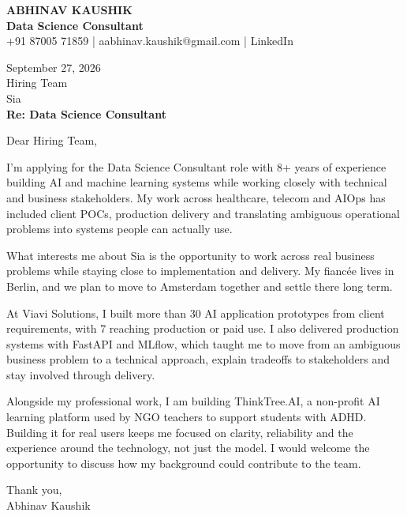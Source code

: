 \documentclass[10pt,a4paper]{article}
\begin{document}
\begin{center}
{\Large\bfseries ABHINAV KAUSHIK}\\[2pt]
{\bfseries Data Science Consultant}\\[2pt]
+91 87005 71859 \quad | \quad aabhinav.kaushik@gmail.com \quad | \quad LinkedIn
\end{center}
\vspace{8pt}
September 27, 2026\\[6pt]
Hiring Team\\
Sia\\[4pt]
\textbf{Re: Data Science Consultant}

Dear Hiring Team,

I’m applying for the Data Science Consultant role with 8+ years of experience building AI and machine learning systems while working closely with technical and business stakeholders. My work across healthcare, telecom and AIOps has included client POCs, production delivery and translating ambiguous operational problems into systems people can actually use.

What interests me about Sia is the opportunity to work across real business problems while staying close to implementation and delivery. My fiancée lives in Berlin, and we plan to move to Amsterdam together and settle there long term.

At Viavi Solutions, I built more than 30 AI application prototypes from client requirements, with 7 reaching production or paid use. I also delivered production systems with FastAPI and MLflow, which taught me to move from an ambiguous business problem to a technical approach, explain tradeoffs to stakeholders and stay involved through delivery.

Alongside my professional work, I am building ThinkTree.AI, a non-profit AI learning platform used by NGO teachers to support students with ADHD. Building it for real users keeps me focused on clarity, reliability and the experience around the technology, not just the model. I would welcome the opportunity to discuss how my background could contribute to the team.

Thank you,\\
Abhinav Kaushik
\end{document}
